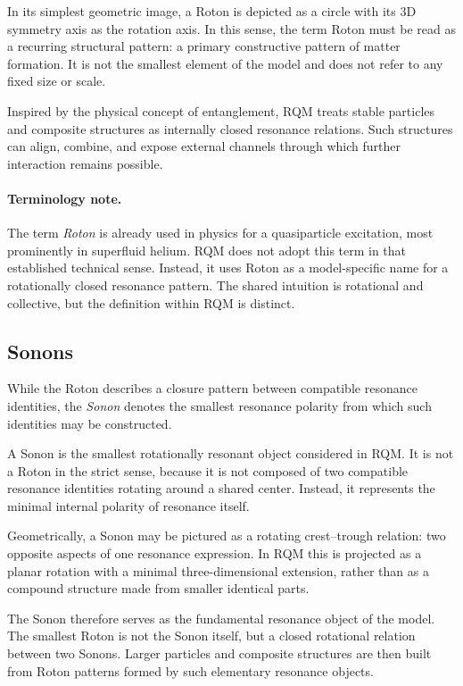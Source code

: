 \documentclass[11pt,a4paper]{article}
\begin{document}
In its simplest geometric image, a Roton is depicted as a circle with its 3D symmetry axis as the rotation axis. In this sense, the term Roton must be read as a recurring structural pattern: a primary constructive pattern of matter formation. It is not the smallest element of the model and does not refer to any fixed size or scale.

Inspired by the physical concept of entanglement, RQM treats stable particles and composite structures as internally closed resonance relations. Such structures can align, combine, and expose external channels through which further interaction remains possible.

\paragraph{Terminology note.}
The term \emph{Roton} is already used in physics for a quasiparticle excitation, most prominently in superfluid helium. RQM does not adopt this term in that established technical sense. Instead, it uses Roton as a model-specific name for a rotationally closed resonance pattern. The shared intuition is rotational and collective, but the definition within RQM is distinct.


\subsection{Sonons}

While the Roton describes a closure pattern between compatible resonance identities, the \emph{Sonon} denotes the smallest resonance polarity from which such identities may be constructed.

A Sonon is the smallest rotationally resonant object considered in RQM. It is not a Roton in the strict sense, because it is not composed of two compatible resonance identities rotating around a shared center. Instead, it represents the minimal internal polarity of resonance itself.

Geometrically, a Sonon may be pictured as a rotating crest–trough relation: two opposite aspects of one resonance expression. In RQM this is projected as a planar rotation with a minimal three-dimensional extension, rather than as a compound structure made from smaller identical parts.

The Sonon therefore serves as the fundamental resonance object of the model. The smallest Roton is not the Sonon itself, but a closed rotational relation between two Sonons. Larger particles and composite structures are then built from Roton patterns formed by such elementary resonance objects.
\end{document}
